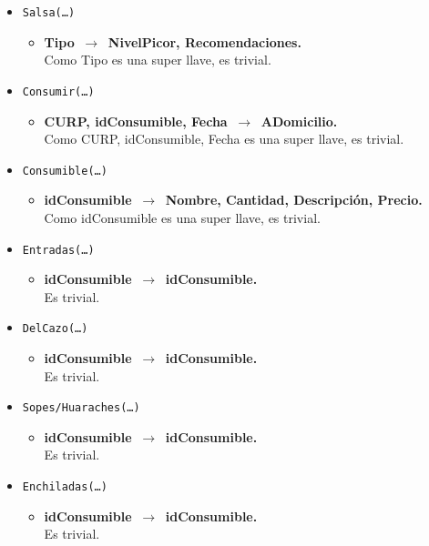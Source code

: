 \documentclass{article}
\newcommand{\flecha}{$\,\to\,$ }
\begin{document}
\begin{itemize}
\item \texttt{Salsa(\ldots)}
	\begin{itemize}
		\item \textbf{Tipo \flecha NivelPicor, Recomendaciones.}\\
		Como Tipo es una super llave, es trivial.
	\end{itemize}

\item \texttt{Consumir(\ldots)}
	\begin{itemize}
		\item \textbf{CURP, idConsumible, Fecha \flecha ADomicilio.}\\
		Como CURP, idConsumible, Fecha es una super llave, es trivial.
	\end{itemize}

\item \texttt{Consumible(\ldots)}
	\begin{itemize}
		\item \textbf{idConsumible \flecha Nombre, Cantidad, Descripción, Precio.}\\
		Como idConsumible es una super llave, es trivial.
	\end{itemize}

\item \texttt{Entradas(\ldots)}
	\begin{itemize}
		\item \textbf{idConsumible \flecha idConsumible.}\\
		Es trivial.
	\end{itemize}

\item \texttt{DelCazo(\ldots)}
	\begin{itemize}
		\item \textbf{idConsumible \flecha idConsumible.}\\
		Es trivial.
	\end{itemize}

\item \texttt{Sopes/Huaraches(\ldots)}
	\begin{itemize}
		\item \textbf{idConsumible \flecha idConsumible.}\\
		Es trivial.
	\end{itemize}

\item \texttt{Enchiladas(\ldots)}
	\begin{itemize}
		\item \textbf{idConsumible \flecha idConsumible.}\\
		Es trivial.
	\end{itemize}


\end{itemize}
\end{document}
